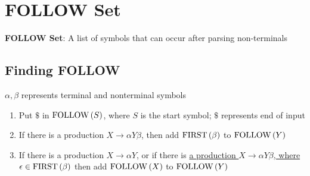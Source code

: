 \section{FOLLOW Set}

  \begin{definition}
    \textbf{FOLLOW Set}: A list of symbols that can occur after parsing
    non-terminals
  \end{definition}

  \subsection{Finding FOLLOW}

    $ \alpha, \beta $ represents terminal and nonterminal symbols

    \begin{enumerate}
      \item Put $ \$ $ in $ \operatorname{FOLLOW}\left( S \right) $, where $ S $ is the start
      symbol; $ \$ $ represents end of input
      \item If there is a production $ X \to \alpha Y \beta $, then add
      $ \operatorname{FIRST}\left( \beta \right) $ to $ \operatorname{FOLLOW}\left( Y \right) $
      \item If there is a production $ X \to \alpha Y $, or if there is \ul{a
      production $ X \to \alpha Y \beta $, where
      $ \epsilon \in \operatorname{FIRST}\left( \beta \right) $} then add
      $ \operatorname{FOLLOW}\left( X \right) $ to $ \operatorname{FOLLOW}\left( Y \right) $
    \end{enumerate}
